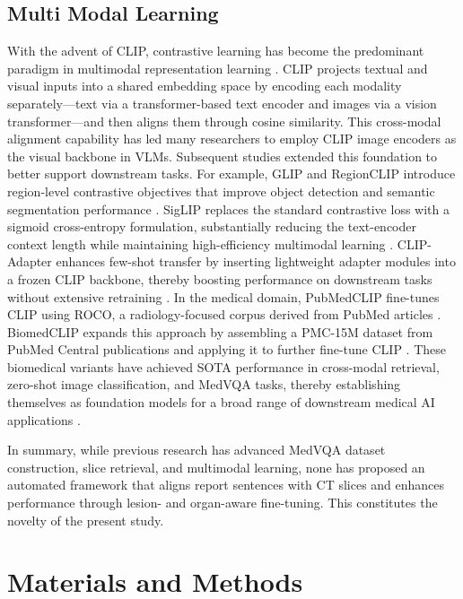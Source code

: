 \documentclass[bioengineering,article,submit,pdftex,moreauthors]{Definitions/mdpi}
\begin{document}
\subsection{Multi Modal Learning}
With the advent of CLIP, contrastive learning has become the predominant paradigm in multimodal representation learning \cite{radford_learning_2021}. 
CLIP projects textual and visual inputs into a shared embedding space by encoding each modality separately—text via a transformer-based text encoder and images via a vision transformer—and then aligns them through cosine similarity. 
This cross-modal alignment capability has led many researchers to employ CLIP image encoders as the visual backbone in VLMs. 
Subsequent studies extended this foundation to better support downstream tasks. For example, GLIP and RegionCLIP introduce region-level contrastive objectives that improve object detection and semantic segmentation performance \cite{li_grounded_2022,zhong_regionclip_2022}.
SigLIP replaces the standard contrastive loss with a sigmoid cross-entropy formulation, substantially reducing the text-encoder context length while maintaining high-efficiency multimodal learning \cite{zhai_sigmoid_2023}. 
CLIP-Adapter enhances few-shot transfer by inserting lightweight adapter modules into a frozen CLIP backbone, thereby boosting performance on downstream tasks without extensive retraining \cite{gao_clip-adapter_2024}. 
In the medical domain, PubMedCLIP fine-tunes CLIP using ROCO, a radiology-focused corpus derived from PubMed articles \cite{eslami_pubmedclip_2023,pelka_radiology_2018}. 
BiomedCLIP expands this approach by assembling a PMC-15M dataset from PubMed Central publications and applying it to further fine-tune CLIP \cite{zhang_biomedclip_2025}. 
These biomedical variants have achieved SOTA performance in cross-modal retrieval, zero-shot image classification, and MedVQA tasks, thereby establishing themselves as foundation models for a broad range of downstream medical AI applications \cite{koleilat_medclip-sam_2024,zhao_foundation_2024,polis_exploring_2025}.


In summary, while previous research has advanced MedVQA dataset construction, slice retrieval, and multimodal learning, none has proposed an automated framework that aligns report sentences with CT slices and enhances performance through lesion- and organ-aware fine-tuning. This constitutes the novelty of the present study.


\section{Materials and Methods}
\end{document}
